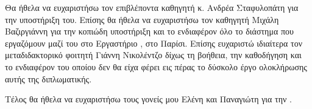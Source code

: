 \begin{acknowledgements}
Θα ήθελα να ευχαριστήσω τον επιβλέποντα καθηγητή κ. Ανδρέα Σταφυλοπάτη για την υποστήριξη του.
Επίσης θα ήθελα να ευχαριστήσω τον καθηγητή Μιχάλη Βαζιργιάννη για την κοπιώδη υποστήριξη και το ενδιαφέρον όλο το διάστημα που εργαζόμουν μαζί του στο Εργαστήριο , στο Παρίσι. 
Επίσης ευχαριστώ ιδιαίτερα τον μεταδιδακτορικό φοιτητή Γιάννη Νικολέντζο δίχως τη βοήθεια, την καθοδήγηση και το ενδιαφέρον του οποίου δεν θα είχα φέρει εις πέρας το δύσκολο έργο ολοκλήρωσης αυτής της διπλωματικής.

Τέλος θα ήθελα να ευχαριστήσω τους γονείς μου Ελένη και Παναγιώτη για την . 
\end{acknowledgements}


